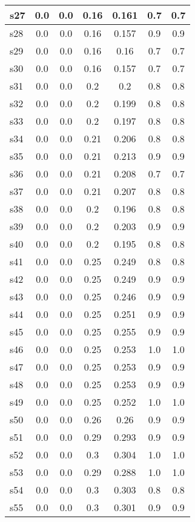 \documentclass{article}
\begin{document}
\begin{tabular}{|l|c|c|c|c|c|c|}
s27 &0.0 & 0.0 & 0.16 & 0.161 & 0.7 & 0.7\\
\hline
s28 &0.0 & 0.0 & 0.16 & 0.157 & 0.9 & 0.9\\
\hline
s29 &0.0 & 0.0 & 0.16 & 0.16 & 0.7 & 0.7\\
\hline
s30 &0.0 & 0.0 & 0.16 & 0.157 & 0.7 & 0.7\\
\hline
s31 &0.0 & 0.0 & 0.2 & 0.2 & 0.8 & 0.8\\
\hline
s32 &0.0 & 0.0 & 0.2 & 0.199 & 0.8 & 0.8\\
\hline
s33 &0.0 & 0.0 & 0.2 & 0.197 & 0.8 & 0.8\\
\hline
s34 &0.0 & 0.0 & 0.21 & 0.206 & 0.8 & 0.8\\
\hline
s35 &0.0 & 0.0 & 0.21 & 0.213 & 0.9 & 0.9\\
\hline
s36 &0.0 & 0.0 & 0.21 & 0.208 & 0.7 & 0.7\\
\hline
s37 &0.0 & 0.0 & 0.21 & 0.207 & 0.8 & 0.8\\
\hline
s38 &0.0 & 0.0 & 0.2 & 0.196 & 0.8 & 0.8\\
\hline
s39 &0.0 & 0.0 & 0.2 & 0.203 & 0.9 & 0.9\\
\hline
s40 &0.0 & 0.0 & 0.2 & 0.195 & 0.8 & 0.8\\
\hline
s41 &0.0 & 0.0 & 0.25 & 0.249 & 0.8 & 0.8\\
\hline
s42 &0.0 & 0.0 & 0.25 & 0.249 & 0.9 & 0.9\\
\hline
s43 &0.0 & 0.0 & 0.25 & 0.246 & 0.9 & 0.9\\
\hline
s44 &0.0 & 0.0 & 0.25 & 0.251 & 0.9 & 0.9\\
\hline
s45 &0.0 & 0.0 & 0.25 & 0.255 & 0.9 & 0.9\\
\hline
s46 &0.0 & 0.0 & 0.25 & 0.253 & 1.0 & 1.0\\
\hline
s47 &0.0 & 0.0 & 0.25 & 0.253 & 0.9 & 0.9\\
\hline
s48 &0.0 & 0.0 & 0.25 & 0.253 & 0.9 & 0.9\\
\hline
s49 &0.0 & 0.0 & 0.25 & 0.252 & 1.0 & 1.0\\
\hline
s50 &0.0 & 0.0 & 0.26 & 0.26 & 0.9 & 0.9\\
\hline
s51 &0.0 & 0.0 & 0.29 & 0.293 & 0.9 & 0.9\\
\hline
s52 &0.0 & 0.0 & 0.3 & 0.304 & 1.0 & 1.0\\
\hline
s53 &0.0 & 0.0 & 0.29 & 0.288 & 1.0 & 1.0\\
\hline
s54 &0.0 & 0.0 & 0.3 & 0.303 & 0.8 & 0.8\\
\hline
s55 &0.0 & 0.0 & 0.3 & 0.301 & 0.9 & 0.9\\

\end{tabular}
\end{document}
